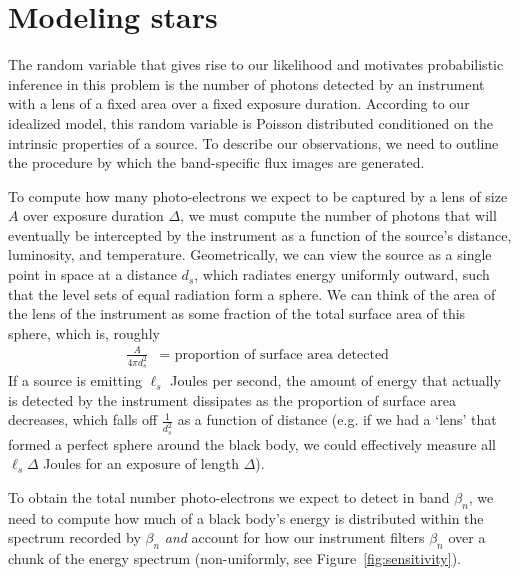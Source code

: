 \documentclass[11pt]{article}
\begin{document}
\section{Modeling stars}
The random variable that gives rise to our likelihood and motivates probabilistic inference in this problem is the number of photons detected by an instrument with a lens of a fixed area over a fixed exposure duration.  According to our idealized model, this random variable is Poisson distributed conditioned on the intrinsic properties of a source.  To describe our observations, we need to outline the procedure by which the band-specific flux images are generated.  

To compute how many photo-electrons we expect to be captured by a lens of size $A$ over exposure duration $\Delta$, we must compute the number of photons that will eventually be intercepted by the instrument as a function of the source's distance, luminosity, and temperature.  Geometrically, we can view the source as a single point in space at a distance $d_s$, which radiates energy uniformly outward, such that the level sets of equal radiation form a sphere.  We can think of the area of the lens of the instrument as some fraction of the total surface area of this sphere, which is, roughly
\begin{align}
  \frac{A}{4\pi d_s^2} &= \text{ proportion of surface area detected }
\end{align}
If a source is emitting $\ell_s$ Joules per second, the amount of energy that actually is detected by the instrument dissipates as the proportion of surface area decreases, which falls off $\frac{1}{d_s^2}$ as a function of distance (e.g. if we had a `lens' that formed a perfect sphere around the black body, we could effectively measure all $\ell_s \Delta$ Joules for an exposure of length $\Delta$).  

To obtain the total number photo-electrons we expect to detect in band $\beta_n$, we need to compute how much of a black body's energy is distributed within the spectrum recorded by $\beta_n$ \emph{and} account for how our instrument filters $\beta_n$ over a chunk of the energy spectrum (non-uniformly, see Figure~\ref{fig:sensitivity}).
\end{document}
